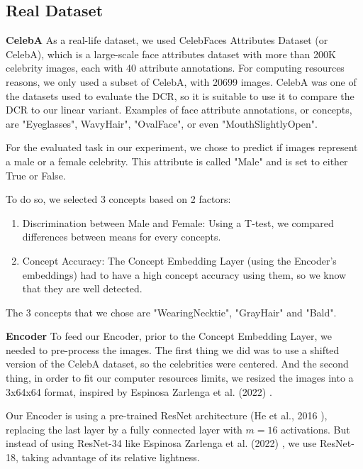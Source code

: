 \documentclass[sigconf, nonacm]{acmart}
\begin{document}
\subsection{Real Dataset}
\vspace{2pt}
\textbf{CelebA} As a real-life dataset, we used CelebFaces Attributes Dataset (or CelebA), which is a large-scale face attributes dataset with more than 200K celebrity images, each with 40 attribute annotations. For computing resources reasons, we only used a subset of CelebA, with 20699 images. CelebA was one of the datasets used to evaluate the DCR, so it is suitable to use it to compare the DCR to our linear variant. Examples of face attribute annotations, or concepts, are "Eyeglasses", Wavy\textunderscore Hair", "Oval\textunderscore Face", or even "Mouth\textunderscore Slightly\textunderscore Open".

For the evaluated task in our experiment, we chose to predict if images represent a male or a female celebrity. This attribute is called "Male" and is set to either True or False.

To do so, we selected 3 concepts based on 2 factors: \vspace{4pt}
\begin{enumerate}
    \item Discrimination between Male and Female: Using a T-test, we compared differences between means for every concepts. \vspace{1pt}
    \item Concept Accuracy: The Concept Embedding Layer (using the Encoder's embeddings) had to have a high concept accuracy using them, so we know that they are well detected.
\end{enumerate}
The 3 concepts that we chose are "Wearing\textunderscore Necktie", "Gray\textunderscore Hair" and "Bald". \vspace{8pt}

\textbf{Encoder} To feed our Encoder, prior to the Concept Embedding Layer, we needed to pre-process the images. The first thing we did was to use a shifted version of the CelebA dataset, so the celebrities were centered. And the second thing, in order to fit our computer resources limits, we resized the images into a 3x64x64 format, inspired by Espinosa Zarlenga et al. (2022) \cite{espinosa2022concept}.

Our Encoder is using a pre-trained ResNet architecture (He et al., 2016 \cite{he2016residuallearning}), replacing the last layer by a fully connected layer with \( m = 16 \) activations. But instead of using ResNet-34 like Espinosa Zarlenga et al. (2022) \cite{espinosa2022concept}, we use ResNet-18, taking advantage of its relative lightness. \vspace{8pt}
\end{document}
